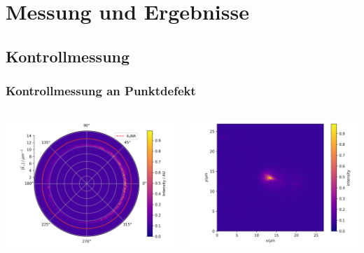 \documentclass[aspectratio=1610]{beamer}
\begin{document}
	\section{Messung und Ergebnisse}
		\subsection{Kontrollmessung}
			\begin{frame}
				\frametitle{Kontrollmessung an Punktdefekt}
				\begin{columns}
					\begin{column}{0.5\textwidth}
							\includegraphics[width=\textwidth]{figures/example_polar.png}
					\end{column}
					\begin{column}{0.5\textwidth}  %
						\includegraphics[width=\textwidth]{figures/example_focal_plane.png}
					\end{column}
				\end{columns}
			\end{frame}
			
\end{document}
